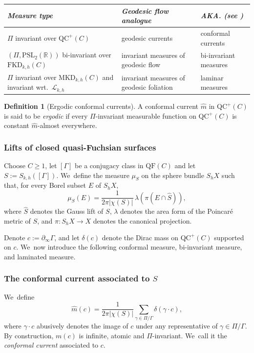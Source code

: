 \documentclass[JEP,XML,SOM,Unicode,NoEqCountersInSection,published]{cedram}
\theoremstyle{plain}
\theoremstyle{definition}
\newtheorem{defi}[theorem]{Definition}
\newcommand\PSL{\mathrm{PSL}_2(\mathbb{R})}
\newcommand{\cL}{{\mathcal L}}
\newcommand{\QF}{\mathrm{QF}}
\newcommand{\QC}{\mathrm{QC}}
\newcommand{\MKD}{\mathrm{MKD}}
\newcommand{\FKD}{\mathrm{FKD}}
\newcommand{\bord}{\partial_{\infty}}
\begin{document}
\medskip
\begin{center}
\begin{tabularx}{\textwidth}{|>{\raggedright\arraybackslash}p{5cm}
|>{\raggedright\arraybackslash}X
|>{\raggedright\arraybackslash}X|}
\hline
\small\emph{Measure type} &
\small\emph{Geodesic flow analogue} &
\small\emph{AKA. (see \cite{LabourieBourbaki,MN_currents})} \\
\hline
\small $\Pi$ invariant over $\QC^+(C)$ &
\small geodesic currents &
\small conformal currents \\
\small $(\Pi,\PSL)$ bi-invariant over $\FKD_{k,h}(C)$ &
\small invariant measures of geodesic flow &
\small bi-invariant measures \\
\small $\Pi$ invariant over $\MKD_{k,h}(C)$ and invariant wrt.\ $\cL_{k,h}$ &
\small invariant measures of geodesic foliation &
\small laminar measures \\
\hline
\end{tabularx}
\end{center}

\begin{defi}[Ergodic conformal currents]
A conformal current $\hat m$ in $\QC^+(C)$ is said to be \emph{ergodic} if every $\Pi$-invariant measurable function on $\QC^+(C)$ is constant $\hat m$-almost everywhere.
\end{defi}

\subsubsection{Lifts of closed quasi-Fuchsian surfaces}\label{sss.lifts} Choose $C\geq 1$, let $[\Gamma]$ be a conjugacy class in $\QF(C)$ and let $S:=S_{k,h}([\Gamma])$. We~define the measure $\mu_S$ on the sphere bundle $S_h X$ such that, for every Borel subset $E$ of $S_h X$,
\begin{equation}\label{eq.inv_measure}
\mu_S(E)=\frac{1}{2\pi|\chi(S)|}\,\lambda(\pi(E\cap\hat S)),
\end{equation}
where $\hat S$ denotes the Gauss lift of $S$, $\lambda$ denotes the area form of the Poincaré metric of $S$, and $\pi:S_hX\to X$ denotes the canonical projection.

Denote $c:=\bord\Gamma$, and let $\delta(c)$ denote the Dirac mass on $\QC^+(C)$ supported on $c$. We~now introduce the following conformal measure, bi-invariant measure, and laminated measure.

\subsubsection*{The conformal current associated to $S$}
We~define
\begin{equation*}
\hat m(c)=\frac{1}{2\pi|\chi(S)|}\sum_{\gamma\in\Pi/\Gamma}\delta(\gamma\cdot c),
\end{equation*}
where $\gamma\cdot c$ abusively denotes the image of $c$ under any representative of $\gamma\in\Pi/\Gamma$. By construction, $m(c)$ is infinite, atomic and $\Pi$-invariant. We~call it the \emph{conformal current} associated to $c$.
\end{document}
